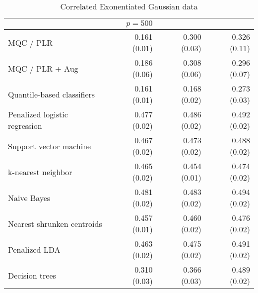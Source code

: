 \begin{table}[p]
\begin{adjustbox}{max size={\textwidth}{10cm}}
\begin{tabular}{l@{\extracolsep{15mm}}rrr}
      \hline
      & $p = 500$ \\
      \hline

      MQC / PLR & 0.161 (0.01) & 0.300 (0.03) & 0.326 (0.11) \\ 
      MQC / PLR + Aug & 0.186 (0.06) & 0.308 (0.06) & 0.296 (0.07) \\ 
      Quantile-based classifiers & 0.161 (0.01) & 0.168 (0.02) & 0.273 (0.03) \\ 
      Penalized logistic regression & 0.477 (0.02) & 0.486 (0.02) & 0.492 (0.02) \\ 
      Support vector machine & 0.467 (0.02) & 0.473 (0.02) & 0.488 (0.02) \\ 
      k-nearest neighbor & 0.465 (0.02) & 0.454 (0.01) & 0.474 (0.02) \\ 
      Naive Bayes & 0.481 (0.02) & 0.483 (0.02) & 0.494 (0.02) \\ 
      Nearest shrunken centroids & 0.457 (0.01) & 0.460 (0.02) & 0.476 (0.02) \\ 
      Penalized LDA & 0.463 (0.02) & 0.475 (0.02) & 0.491 (0.02) \\ 
      Decision trees & 0.310 (0.03) & 0.366 (0.03) & 0.489 (0.02) \\ 
      \hline
      
    \end{tabular}
  \end{adjustbox}
  \caption{Correlated Exonentiated Gaussian data}
\end{table}







